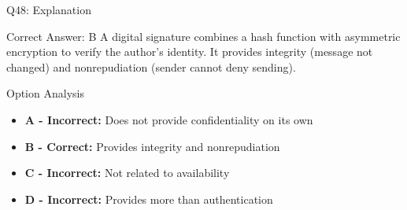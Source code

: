 \documentclass{beamer}
\begin{document}
	\begin{frame}{Q48: Explanation}
		\begin{block}{Correct Answer: B}
			A digital signature combines a hash function with asymmetric encryption to verify the author's identity. It provides integrity (message not changed) and nonrepudiation (sender cannot deny sending).
		\end{block}
		\begin{block}{Option Analysis}
			\begin{itemize}
				\item \textbf{A - Incorrect:} Does not provide confidentiality on its own
				\item \textbf{B - Correct:} Provides integrity and nonrepudiation
				\item \textbf{C - Incorrect:} Not related to availability
				\item \textbf{D - Incorrect:} Provides more than authentication
			\end{itemize}
		\end{block}
	\end{frame}
	
	
	
\end{document}
